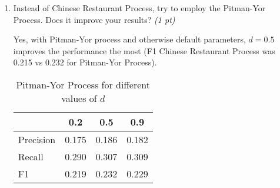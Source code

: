 \documentclass[a4paper]{article}
\begin{document}
\begin{enumerate}
	\item Instead of Chinese Restaurant Process, try to employ the Pitman-Yor
		Process. Does it improve your results? \textit{(1 pt)}

        Yes, with Pitman-Yor process and otherwise default parameters, $d=0.5$
        improves the performance the most (F1 Chinese Restaurant Process was
        0.215 vs 0.232 for Pitman-Yor Process).

		\begin{table}[H]
			\centering
			\caption{Pitman-Yor Process for different values of $d$}
			\label{tab:pyor}
			\begin{tabular}{l|c|c|c}
			& 0.2 & 0.5 & 0.9 \\
			\hline
				Precision & 0.175 & 0.186 & 0.182 \\
				Recall & 0.290 & 0.307 & 0.309 \\
				F1 & 0.219 & 0.232 & 0.229
			\end{tabular}
		\end{table}

\end{enumerate}

\end{document}

